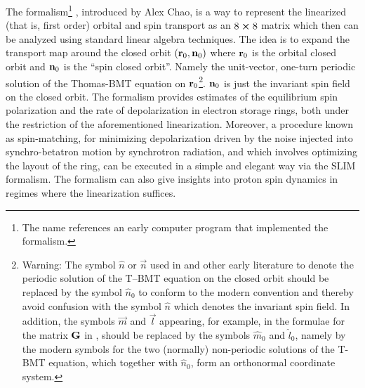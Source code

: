 The  formalism\footnote
  {
The name references an early computer program that implemented the formalism.
  }
\cite{b:chao.spin,b:barber99}, introduced by Alex Chao, is a way to represent the linearized (that
is, first order) orbital and spin transport as an $8 \mathbin{\boldsymbol{\times}} 8$ matrix which then can be analyzed
using standard linear algebra techniques. The idea is to expand the transport map around the closed
orbit $({\bf r}_0, {\bf n}_0)$ where ${\bf r}_0$ is the orbital closed orbit and ${\bf n}_0$ is the ``spin
closed orbit''. Namely the unit-vector, one-turn periodic solution of the Thomas-BMT equation on
${\bf r}_0$\footnote
  {
Warning: The symbol $\hat n$ or
$\vec n$ used in \cite{b:chao.spin,b:barber85} and other early literature to denote the periodic
solution of the T--BMT equation on the closed orbit should be replaced by the symbol $\hat n_0$ to
conform to the modern convention \cite{b:barber99} and thereby avoid confusion with the symbol $\hat
n$ which denotes the invariant spin field.  In addition, the symbols $\vec m$ and $\vec l$
appearing, for example, in the formulae for the matrix ${\bf G}$ in \cite{b:barber85}, should be
replaced by the symbols $\hat m_0$ and $\hat l_0$, namely by the modern symbols for the two
(normally) non-periodic solutions of the T-BMT equation, which together with $\hat n_0$, form an
orthonormal coordinate system.
  }.
% 
${\bf n}_0$ is just the invariant spin field on the closed orbit. The formalism provides estimates of
the equilibrium spin polarization and the rate of depolarization in electron storage rings, both
under the restriction of the aforementioned linearization. Moreover, a procedure known as
spin-matching, for minimizing depolarization driven by the noise injected into synchro-betatron
motion by synchrotron radiation, and which involves optimizing the layout of the ring, can be
executed in a simple and elegant way via the SLIM formalism. The formalism can also give insights
into proton spin dynamics in regimes where the linearization suffices.

